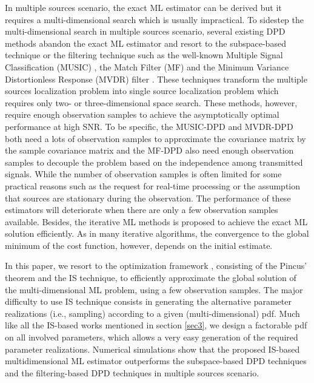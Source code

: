 \documentclass[review]{elsarticle}
\begin{document}
In multiple sources scenario, the exact ML estimator can be derived but it requires a multi-dimensional search which is usually impractical. To sidestep the multi-dimensional search in multiple sources scenario, several existing DPD methods abandon the exact ML estimator and resort to the subspace-based technique or the filtering technique such as the well-known Multiple Signal Classification (MUSIC) \cite{DPD2005}, the Match Filter (MF) \cite{2004Direct} and the Minimum Variance Distortionless Response (MVDR) filter \cite{Tirer2015High}. These techniques transform the multiple sources localization problem into single source localization problem which requires only two- or three-dimensional space search. 
These methods, however, require enough observation samples to achieve the asymptotically optimal performance at high SNR. To be specific, the MUSIC-DPD \cite{DPD2005} and MVDR-DPD \cite{Tirer2015High} both need a lots of observation samples to approximate the covariance matrix by the sample covariance matrix and the MF-DPD \cite{2004Direct} also need enough observation samples to decouple the problem based on the independence among transmitted signals. While the number of observation samples is often limited for some practical reasons such as the request for real-time processing or the assumption that sources are stationary during the observation. The performance of these estimators will deteriorate when there are only a few observation samples available. Besides, the iterative ML methods \cite{2006Efficient} is proposed to achieve the exact ML solution efficiently. As in many iterative algorithms, the convergence to the global minimum of the cost function, however, depends on the initial estimate.

In this paper, we resort to the optimization framework \cite{Kay2000Mean}, consisting of the Pincus' theorem \cite{Pincus1968A} and the IS technique, to efficiently approximate the global solution of the multi-dimensional ML problem, using a few observation samples. The major difficulty to use IS technique consists in generating the alternative parameter realizations (i.e., sampling) according to a given (multi-dimensional) pdf. Much like all the IS-based works mentioned in section \ref{sec3}, we design a factorable pdf on all involved parameters, which allows a very easy generation of the required parameter realizations. Numerical simulations show that the proposed IS-based multidimensional ML estimator outperforms the subspace-based DPD techniques and the filtering-based DPD techniques in multiple sources scenario.
\end{document}

